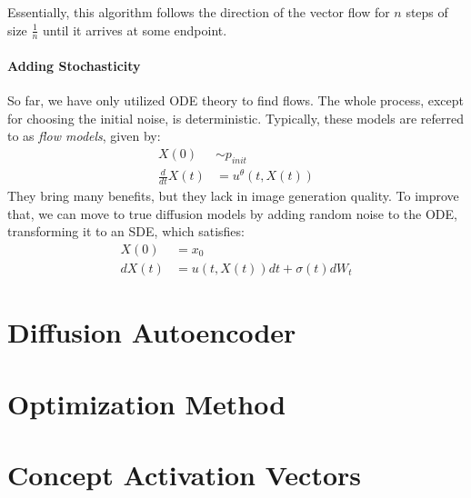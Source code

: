 Essentially, this algorithm follows the direction of the vector flow for $n$ steps of size $\frac{1}{n}$ until it arrives at some endpoint.

\paragraph{Adding Stochasticity} So far, we have only utilized ODE theory to find flows. The whole process, except for choosing the initial noise, is deterministic. Typically, these models are referred to as \emph{flow models}, given by:
\begin{align*}
    X(0) &\sim p_{init} \\
    \frac{d}{dt} X(t) &= u^\theta(t, X(t))
\end{align*}
They bring many benefits, but they lack in image generation quality. To improve that, we can move to true diffusion models by adding random noise to the ODE, transforming it to an SDE, which satisfies:
\begin{align*}
    X(0) &= x_0 \\
    dX(t) &= u(t, X(t))dt + \sigma(t)dW_t
\end{align*}

\section{Diffusion Autoencoder}


\section{Optimization Method}


\section{Concept Activation Vectors}


